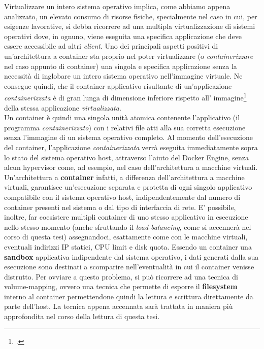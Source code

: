 Virtualizzare un intero sistema operativo implica, come abbiamo appena analizzato, un elevato consumo di risorse fisiche, specialmente nel caso in cui, per esigenze lavorative, si debba ricorrere ad una multipla virtualizzazione di sistemi operativi dove, in ognuno, viene eseguita una specifica applicazione che deve essere accessibile ad altri \textit{client}.
Uno dei principali aspetti positivi di un'architettura a container sta proprio nel poter virtualizzare (o \textit{containerizzare} nel caso appunto di container) una singola e specifica applicazione senza la necessità di inglobare un intero sistema operativo nell'immagine virtuale. Ne consegue quindi, che il container applicativo risultante di un'applicazione \textit{containerizzata} è di gran lunga di dimensione inferiore rispetto all' immagine\footcite{inteso come dimensione in Gb del virtual disk image (*.vdi) dell'immagine virtualizzata} della stessa applicazione \textit{virtualizzata}.\\
Un container è quindi una singola unità atomica contenente l'applicativo (il programma \textit{containerizzato}) con i relativi file atti alla sua corretta esecuzione senza l'immagine di un sistema operativo completo.
Al momento dell'esecuzione del container, l'applicazione \textit{containerizzata} verrà eseguita immediatamente sopra lo stato del sistema operativo host, attraverso l'aiuto del Docker Engine, senza alcun hypervisor come, ad esempio, nel caso dell'architettura a macchine virtuali.
Un'architettura a \textbf{container} infatti, a differenza dell'architettura a macchine virtuali, garantisce un'esecuzione separata e protetta di ogni singolo applicativo compatibile con il sistema operativo host, indipendentemente dal numero di container presenti nel sistema o dal tipo di interfaccia di rete. E' possibile, inoltre, far coesistere multipli container di uno stesso applicativo in esecuzione nello stesso momento (anche sfruttando il \textit{load-balancing}, come si accennerà nel corso di questa tesi) assegnandoci, esattamente come con le macchine virtuali, eventuali indirizzi IP statici, CPU limit e disk quota.
Essendo un container una \textbf{\gls{sandbox}} applicativa indipendente dal sistema operativo, i dati generati dalla sua esecuzione sono destinati a scomparire nell'eventualità in cui il container venisse distrutto. Per ovviare a questo problema, si può ricorrere ad una tecnica di volume-mapping, ovvero una tecnica che permette di esporre il \textbf{\gls{filesystem}} interno al container permettendone quindi la lettura e scrittura direttamente da parte dell'host. La tecnica appena accennata sarà trattata in maniera più approfondita nel corso della lettura di questa tesi.
